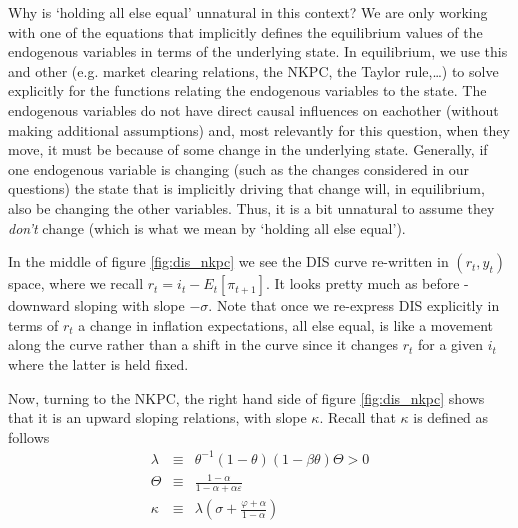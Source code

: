 \documentclass[authoryear,11pt]{elsarticle}
\begin{document}
Why is `holding all else equal' unnatural in this context? We are only working with one of the equations that implicitly defines the equilibrium values of the endogenous variables in terms of the underlying state. In equilibrium, we use this and other (e.g. market clearing relations, the NKPC, the Taylor rule,\ldots) to solve explicitly for the functions relating the endogenous variables to the state. The endogenous variables do not have direct causal influences on eachother (without making additional assumptions) and, most relevantly for this question, when they move, it must be because of some change in the underlying state. Generally, if one endogenous variable is changing (such as the changes considered in our questions) the state that is implicitly driving that change will, in equilibrium, also be changing the other variables. Thus, it is a bit unnatural to assume they \emph{don't} change (which is what we mean by `holding all else equal').

In the middle of figure \ref{fig:dis_nkpc} we see the DIS curve re-written in $(r_{t},y_{t})$ space, where we recall $r_{t} = i_{t} - E_{t}[\pi_{t+1}]$. It looks pretty much as before - downward sloping with slope $-\sigma$. Note that once we re-express DIS explicitly in terms of $r_{t}$ a change in inflation expectations, all else equal, is like a movement along the curve rather than a shift in the curve since it changes $r_{t}$ for a given $i_{t}$ where the latter is held fixed.

Now, turning to the NKPC, the right hand side of figure \ref{fig:dis_nkpc} shows that it is an upward sloping relations, with slope $\kappa$. Recall that $\kappa$ is defined as follows
\begin{eqnarray*}
\lambda 			&\equiv& 	\theta^{-1}(1-\theta)(1-\beta\theta)\Theta > 0 \\
\Theta 			&\equiv& 	\frac{1-\alpha}{1-\alpha + \alpha \varepsilon} \\
\kappa			&\equiv&	\lambda \left(\sigma + \frac{\varphi + \alpha}{1-\alpha}  \right)
\end{eqnarray*}
\end{document}
